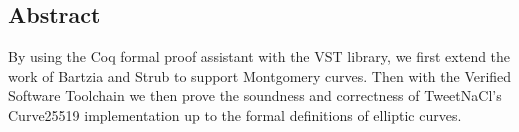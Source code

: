 \subsection*{Abstract}

By using the Coq formal proof assistant with the VST library, we first extend
the work of Bartzia and Strub \cite{DBLP:conf/itp/BartziaS14} to support
Montgomery curves. Then with the Verified Software Toolchain \cite{2012-Appel}
we then prove the soundness and correctness of TweetNaCl's Curve25519 implementation
up to the formal definitions of elliptic curves.
